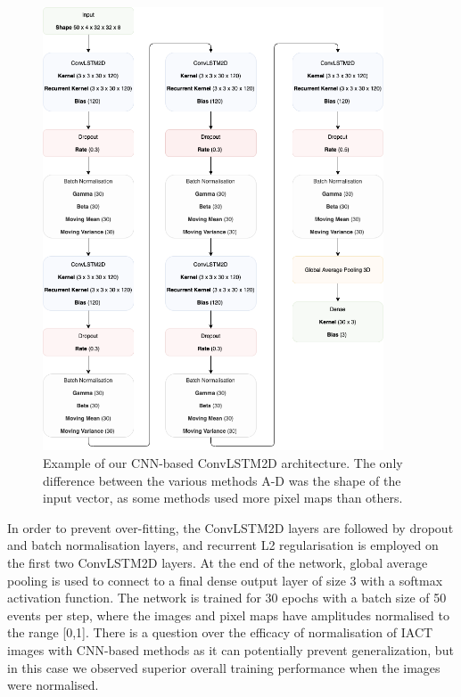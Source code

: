 \begin{figure}
  \centering
  \includegraphics[width=0.9\textwidth]{figures/Newfig3.png}
  \caption{Example of our CNN-based ConvLSTM2D architecture. The only difference between the various methods A-D was the shape of the input vector, as some methods used more pixel maps than others.
  }
  \label{fig:model}
\end{figure}
In order to prevent over-fitting, the ConvLSTM2D layers are followed by dropout and batch normalisation layers, and recurrent L2 regularisation \cite{Keras} is employed on the first two ConvLSTM2D layers. At the end of the network, global average pooling is used to connect to a final dense output layer of size 3 with a softmax activation function. The network is trained for 30 epochs with a batch size of 50 events per step, where the images and pixel maps have amplitudes normalised to the range [0,1]. There is a question over the efficacy of normalisation of IACT images with CNN-based methods as it can potentially prevent generalization, but in this case we observed superior overall training performance when the images were normalised.

